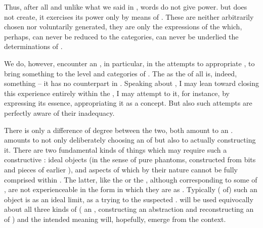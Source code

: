 
\pa\label{pa:positing1}
Thus, after all and unlike what we said in 
, words do not give
power.   but does not create, it
exercises its power only by means of . These  
 are neither arbitrarily chosen nor voluntarily generated, they are
only the  expressions of the  which, perhaps, can
never be reduced to the  categories, can never be underlied
the  determinations of . 


We do, however, encounter   an , in
particular, in the attempts to appropriate , to bring
something  to the level and categories of .
The  as the  of all  is, indeed,
something  -- it has no counterpart in . 
Speaking about , I may lean toward closing
this experience entirely within the \hoa, I may attempt to  it, for
instance, by expressing its essence, appropriating it as a concept. But also 
such attempts are perfectly aware of their inadequacy. 

There is only a difference of degree between the two, both amount to
 an .  amounts to not only deliberately
choosing an  of  but also to actually constructing
it. There are two fundamental kinds of things which may require such a
constructive : ideal objects (in the sense of pure phantoms, 
constructed from  bits and pieces of earlier ),
and aspects of  which by their nature cannot be fully comprised
within \hoa. The latter, like the  or the , although corresponding to some  of , are not
experienceable in the form in which they are  as .
Typically ( of) such an object is  as an ideal
limit, as a  trying to  the suspected
.  will be used equivocally about all three kinds of
 ( an , constructing an abstraction and
reconstructing an  of ) and the intended meaning will,
hopefully, emerge from the context. 

